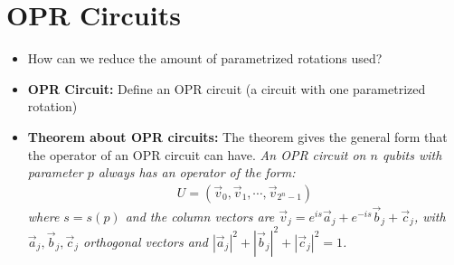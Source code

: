 \section{OPR Circuits}
\begin{itemize}
\item How can we reduce the amount of parametrized rotations used?
\item \textbf{OPR Circuit:} Define an OPR circuit (a circuit with one parametrized rotation)
\item \textbf{Theorem about OPR circuits:} The theorem gives the general form that the operator of an OPR circuit can have. \textit{An OPR circuit on $n$ qubits with parameter $p$ always has an operator of the form:}
\begin{align*}
U = (\vec{v}_0, \vec{v}_1, \cdots, \vec{v}_{2^n-1})
\end{align*}
\textit{where $s = s(p)$ and the column vectors are $\vec{v}_j = e^{is} \vec{a}_j + e^{-is} \vec{b}_j + \vec{c}_j$, with $\vec{a}_j, \vec{b}_j, \vec{c}_j$ orthogonal vectors and $|\vec{a}_j|^2 + |\vec{b}_j|^2 + |\vec{c}_j|^2 = 1$.}
\end{itemize}